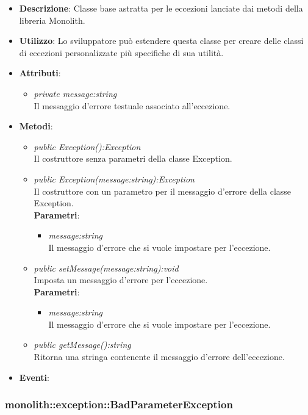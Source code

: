 \begin{itemize}
\item \textbf{Descrizione}: Classe base astratta per le eccezioni lanciate dai metodi della libreria Monolith.
\item \textbf{Utilizzo}: Lo sviluppatore può estendere questa classe per creare delle classi di eccezioni personalizzate più specifiche di sua utilità.
\item \textbf{Attributi}: 
	\begin{itemize}
	\item \textit{private message:string}\\
	Il messaggio d'errore testuale associato all'eccezione.
	\end{itemize}
\item \textbf{Metodi}:
	\begin{itemize}
	\item \textit{public Exception():Exception}\\
	Il costruttore senza parametri della classe Exception.
	\item \textit{public Exception(message:string):Exception}\\
	Il costruttore con un parametro per il messaggio d'errore della classe Exception.
			\\ \textbf{Parametri}: \begin{itemize}
			\item \textit{message:string}\\
			Il messaggio d'errore che si vuole impostare per l'eccezione.
			\end{itemize} 
	\item \textit{public setMessage(message:string):void}\\
	Imposta un messaggio d'errore per l'eccezione.
			\\ \textbf{Parametri}: \begin{itemize}
			\item \textit{message:string}\\
			Il messaggio d'errore che si vuole impostare per l'eccezione.
			\end{itemize} 
	\item \textit{public getMessage():string}\\
	Ritorna una stringa contenente il messaggio d'errore dell'eccezione.
	\end{itemize}
\item \textbf{Eventi}:
\end{itemize}

\subsubsection{monolith::exception::BadParameterException}

